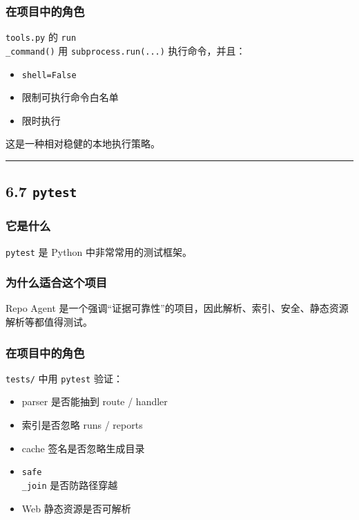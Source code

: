 \documentclass[UTF8,12pt,openany]{ctexbook}
\begin{document}
\subsubsection{在项目中的角色}

\texttt{tools.py} 的 \texttt{run\\_command()} 用 \texttt{subprocess.run(...)} 执行命令，并且：\par

\begin{itemize}
\item \texttt{shell=False}
\item 限制可执行命令白名单
\item 限时执行
\end{itemize}

这是一种相对稳健的本地执行策略。\par

\hrule

\subsection{6.7 \texttt{pytest}}

\subsubsection{它是什么}

\texttt{pytest} 是 Python 中非常常用的测试框架。\par

\subsubsection{为什么适合这个项目}

Repo Agent 是一个强调“证据可靠性”的项目，因此解析、索引、安全、静态资源解析等都值得测试。\par

\subsubsection{在项目中的角色}

\texttt{tests/} 中用 \texttt{pytest} 验证：\par

\begin{itemize}
\item parser 是否能抽到 route / handler
\item 索引是否忽略 runs / reports
\item cache 签名是否忽略生成目录
\item \texttt{safe\\_join} 是否防路径穿越
\item Web 静态资源是否可解析
\end{itemize}
\end{document}
